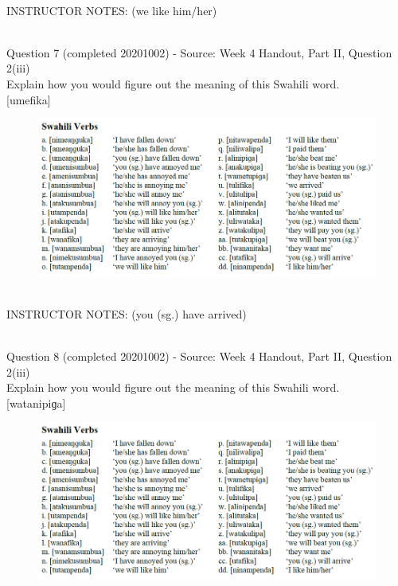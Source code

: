 \documentclass[12pt]{article}
\begin{document}
~\\
INSTRUCTOR NOTES: (we like him/her)


~\\

{\large Question 7} (completed 20201002) - Source: Week 4 Handout, Part II, Question 2(iii)\\

Explain how you would figure out the meaning of this Swahili word.\\

{[umefika]}

\begin{figure}[H]
\includegraphics{../images/swahiliverbs.png}
\end{figure}

~\\
INSTRUCTOR NOTES: (you (sg.) have arrived)


~\\

{\large Question 8} (completed 20201002) - Source: Week 4 Handout, Part II, Question 2(iii)\\

Explain how you would figure out the meaning of this Swahili word.\\

{[watanipiɡa]}

\begin{figure}[H]
\includegraphics{../images/swahiliverbs.png}
\end{figure}
\end{document}
